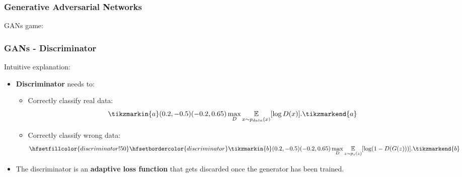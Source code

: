 \documentclass{beamer}
\begin{document}
\begin{frame}
\frametitle{Generative Adversarial Networks}
GANs game:



\end{frame}

\begin{frame}
\frametitle{GANs - Discriminator}
Intuitive explanation:
\begin{itemize}
	\item \textbf{Discriminator} needs to:
	\begin{itemize}
		\item Correctly classify real data: \\  \begin{equation} \tikzmarkin{a}(0.2,-0.5)(-0.2,0.65) \max_D \underset{x \sim p_{data}(x)}{\mathbb{E}} [\log D(x)].\tikzmarkend{a}
		\end{equation}
		\item Correctly classify wrong data: \\  \begin{equation}
		\hfsetfillcolor{discriminator!50}
		\hfsetbordercolor{discriminator} \tikzmarkin{b}(0.2,-0.5)(-0.2,0.65) \max_D  \underset{z \sim p_z(z)}{\mathbb{E}}[\log(1 - D(G(z)))].\tikzmarkend{b} \end{equation}
	\end{itemize}
\item The discriminator is an \textbf{adaptive loss function} that gets discarded once the generator has been trained.
\end{itemize}
\end{frame}
\end{document}
